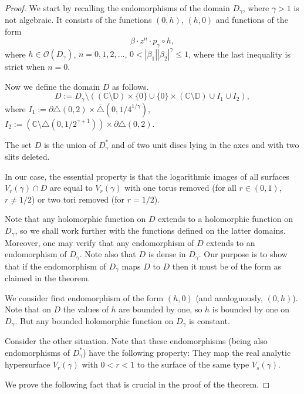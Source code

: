 \documentclass[a4paper,12pt]{amsart}
\theoremstyle{definition}
\begin{document}
\begin{proof} We start by recalling the endomorphisms of the domain $D_{\gamma}$, where $\gamma>1$ is not algebraic. It consists of the functions $(0,h)$, $(h,0)$ and functions of the form 
\begin{equation}\beta\cdot z^n\cdot p_{\gamma}\circ h,
\end{equation}
where $h\in\mathcal O(D_{\gamma})$, $n=0,1,2,\ldots$, $0<|\beta_1||\beta_2|^{\gamma}\leq 1$, where the last inequality is strict when $n=0$.

Now we define the domain $D$ as follows.
\begin{equation}
    D:=D_{\gamma}\setminus\left((\mathbb C\setminus\mathbb D)\times\{0\}\cup \{0\}\times(\mathbb C\setminus\mathbb D)\cup I_1\cup I_2\right),
    \end{equation}
    where $I_1:=\partial\triangle(0,2)\times \overline{\triangle}(0,1/4^{1/\gamma})$, $I_2:=(\mathbb C\setminus\triangle(0,1/2^{\gamma+1}))\times\partial\triangle(0,2)$.

The set $D$ is the union of $D_{\gamma}^*$ and of two unit discs lying in the axes and with two slits deleted. 

In our case, the essential property is that the logarithmic images of all surfaces $V_r(\gamma)\cap D$ are equal to $V_r(\gamma)$ with one torus removed (for all $r\in(0,1)$, $r\neq 1/2$) or two tori removed (for $r=1/2$).

Note that any holomorphic function on $D$ extends to a holomorphic function on $D_{\gamma}$, so we shall work further with the functions defined on the latter domains. Moreover, one may verify that any endomorphism of $D$ extends to an endomorphism of $D_{\gamma}$. Note also that $D$ is dense in $D_{\gamma}$. Our purpose is to show that if the endomorphism of $D_{\gamma}$ maps $D$ to $D$ then it must be of the form as claimed in the theorem.

We consider first endomorphism of the form $(h,0)$ (and analoguously, $(0,h)$). Note that on $D$ the values of $h$ are bounded by one, so $h$ is bounded by one on $D_{\gamma}$. But any bounded holomorphic function on $D_{\gamma}$ is constant.

Consider the other situation. Note that these endomorphisms (being also endomorphisms of $D_{\gamma}^*$) have the following property: They map the real analytic hypersurface $V_r(\gamma)$ with $0<r<1$ to the surface of the same type $V_s(\gamma)$. 

We prove the following fact that is crucial in the proof of the theorem.


\end{proof}
\end{document}
